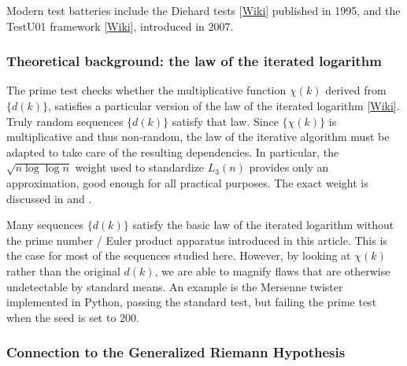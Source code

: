 \documentclass[oneside,10pt]{book}
\begin{document}
Modern test batteries
 include the \textcolor{index}{Diehard tests} [\href{https://en.wikipedia.org/wiki/Diehard_tests}{Wiki}] published in 1995, and the
 \textcolor{index}{TestU01} framework [\href{https://en.wikipedia.org/wiki/TestU01}{Wiki}], introduced in 2007. 



\subsubsection{Theoretical background: the law of the iterated logarithm}

The prime test checks whether the multiplicative function $\chi(k)$ derived from $\{d(k)\}$, satisfies a particular version of the 
 \textcolor{index}{law of the iterated logarithm} [\href{https://en.wikipedia.org/wiki/Law_of_the_iterated_logarithm}{Wiki}]. Truly random sequences $\{d(k)\}$ satisfy that law. Since $\{\chi(k)\}$ is multiplicative and thus non-random, the law of the iterative algorithm
 must be adapted to take care of the resulting dependencies. In particular, the $\sqrt{n\log\log n}$ weight used to standardize
  $L_3(n)$  provides only an approximation, good enough for all practical purposes. The exact weight is discussed in 
  \cite{harper2020} and \cite{yukkam2013}.  

Many sequences $\{d(k)\}$ satisfy the basic law of the iterated logarithm without the prime number / Euler product apparatus introduced 
 in this article. This is the case for most of the sequences studied here. However, by looking at $\chi(k)$ rather than the original 
 $d(k)$, we are able to magnify flaws that are otherwise undetectable by standard means. An example is the Mersenne twister
  implemented in Python, passing the standard test, but failing the prime test when the seed is set to $200$. 

\subsubsection{Connection to the Generalized Riemann Hypothesis}
\end{document}

